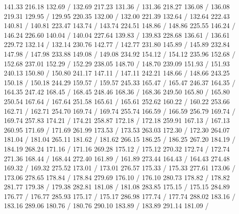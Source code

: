 { 141.33 216.18 132.69 /
 132.69 217.23 131.36 /
 131.36 218.27 136.08 /
 136.08 219.31 129.95 /
 129.95 220.35 132.00 /
 132.00 221.39 132.64 /
 132.64 222.43 140.81 /
 140.81 223.47 143.74 /
 143.74 224.51 148.86 /
 148.86 225.55 146.24 /
 146.24 226.60 140.04 /
 140.04 227.64 139.83 /
 139.83 228.68 136.61 /
 136.61 229.72 132.14 /
 132.14 230.76 142.77 /
 142.77 231.80 145.89 /
 145.89 232.84 147.98 /
 147.98 233.88 149.08 /
 149.08 234.92 154.12 /
 154.12 235.96 152.68 /
 152.68 237.01 152.29 /
 152.29 238.05 148.70 /
 148.70 239.09 151.93 /
 151.93 240.13 150.80 /
 150.80 241.17 147.11 /
 147.11 242.21 148.66 /
 148.66 243.25 150.18 /
 150.18 244.29 159.57 /
 159.57 245.33 165.47 /
 165.47 246.37 164.35 /
 164.35 247.42 168.45 /
 168.45 248.46 168.36 /
 168.36 249.50 165.80 /
 165.80 250.54 167.64 /
 167.64 251.58 165.61 /
 165.61 252.62 160.22 /
 160.22 253.66 162.71 /
 162.71 254.70 169.74 /
 169.74 255.74 166.59 /
 166.59 256.79 169.74 /
 169.74 257.83 174.21 /
 174.21 258.87 172.18 /
 172.18 259.91 167.13 /
 167.13 260.95 171.69 /
 171.69 261.99 173.53 /
 173.53 263.03 172.30 /
 172.30 264.07 181.04 /
 181.04 265.11 181.62 /
 181.62 266.15 186.25 /
 186.25 267.20 184.19 /
 184.19 268.24 171.16 /
 171.16 269.28 175.12 /
 175.12 270.32 172.74 /
 172.74 271.36 168.44 /
 168.44 272.40 161.89 /
 161.89 273.44 164.43 /
 164.43 274.48 169.32 /
 169.32 275.52 173.01 /
 173.01 276.57 175.33 /
 175.33 277.61 173.06 /
 173.06 278.65 178.84 /
 178.84 279.69 176.10 /
 176.10 280.73 178.82 /
 178.82 281.77 179.38 /
 179.38 282.81 181.08 /
 181.08 283.85 175.15 /
 175.15 284.89 176.77 /
 176.77 285.93 175.17 /
 175.17 286.98 177.74 /
 177.74 288.02 183.16 /
 183.16 289.06 180.76 /
 180.76 290.10 183.89 /
 183.89 291.14 181.09 /
}
